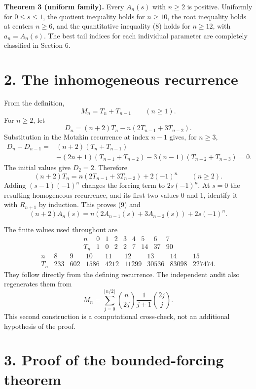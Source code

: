 \documentclass[
  11pt,
  a4paper,
]{article}
\begin{document}
\textbf{Theorem 3 (uniform family).} Every \(A_n(s)\) with \(n\ge2\) is
positive. Uniformly for \(0\le s\le1\), the quotient inequality holds
for \(n\ge10\), the root inequality holds at centers \(n\ge6\), and the
quantitative inequality (8) holds for \(n\ge12\), with \(a_n=A_n(s)\).
The best tail indices for each individual parameter are completely
classified in Section 6.

\section{2. The inhomogeneous
recurrence}\label{the-inhomogeneous-recurrence}

From the definition, \[
M_n=T_n+T_{n-1}\qquad(n\ge1).
\] For \(n\ge2\), let \[
D_n=(n+2)T_n-n(2T_{n-1}+3T_{n-2}).
\] Substitution in the Motzkin recurrence at index \(n-1\) gives, for
\(n\ge3\), \[
\begin{aligned}
D_n+D_{n-1}
={}&(n+2)(T_n+T_{n-1})\\
&-(2n+1)(T_{n-1}+T_{n-2})
-3(n-1)(T_{n-2}+T_{n-3})=0.
\end{aligned}
\] The initial values give \(D_2=2\). Therefore \[
(n+2)T_n=n(2T_{n-1}+3T_{n-2})+2(-1)^n
\qquad(n\ge2).
\tag{10}
\] Adding \((s-1)(-1)^n\) changes the forcing term to \(2s(-1)^n\). At
\(s=0\) the resulting homogeneous recurrence, and its first two values 0
and 1, identify it with \(R_{n+1}\) by induction. This proves (9) and \[
(n+2)A_n(s)=n(2A_{n-1}(s)+3A_{n-2}(s))+2s(-1)^n.
\tag{11}
\]

The finite values used throughout are \[
\begin{array}{c|rrrrrrrr}
n&0&1&2&3&4&5&6&7\\\hline
T_n&1&0&2&2&7&14&37&90
\end{array}
\] \[
\begin{array}{c|rrrrrrrr}
n&8&9&10&11&12&13&14&15\\\hline
T_n&233&602&1586&4212&11299&30536&83098&227474.
\end{array}
\] They follow directly from the defining recurrence. The independent
audit also regenerates them from \[
M_n=\sum_{j=0}^{\lfloor n/2\rfloor}\binom n{2j}\frac1{j+1}\binom{2j}j.
\] This second construction is a computational cross-check, not an
additional hypothesis of the proof.

\section{3. Proof of the bounded-forcing
theorem}\label{proof-of-the-bounded-forcing-theorem}
\end{document}

